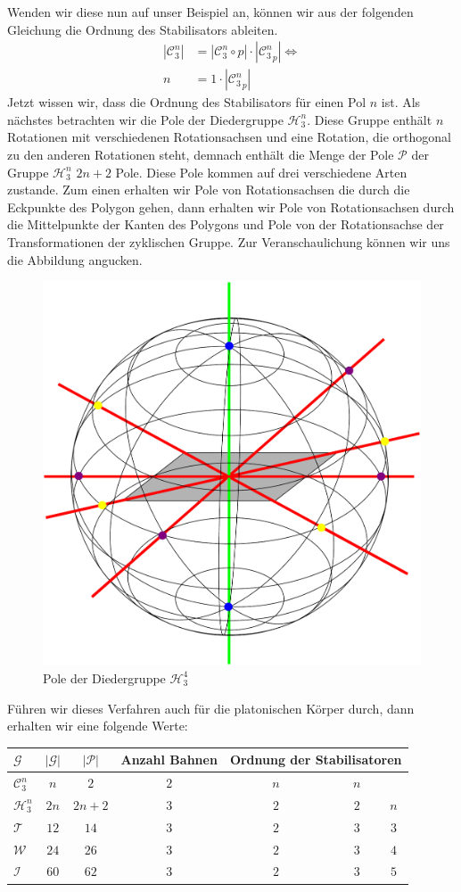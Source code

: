 Wenden wir diese nun auf unser Beispiel an, können wir aus der folgenden Gleichung die Ordnung des Stabilisators ableiten.
\begin{align*}
	 |\mathcal{C}_3^n| &= |\mathcal{C}_3^n \circ p| \cdot |{\mathcal{C}_3^n}_p| \Leftrightarrow\\
	 n &= 1 \cdot |{\mathcal{C}_3^n}_p|
\end{align*}
Jetzt wissen wir, dass die Ordnung des Stabilisators für einen Pol $n$ ist. Als nächstes betrachten wir die Pole der Diedergruppe $\mathcal{H}_3^n$. Diese Gruppe enthält $n$ Rotationen mit verschiedenen Rotationsachsen und eine Rotation, die orthogonal zu den anderen Rotationen steht, demnach enthält die Menge der Pole $\mathcal{P}$ der Gruppe $\mathcal{H}_3^n$ $2n+2$ Pole. Diese Pole kommen auf drei verschiedene Arten zustande. Zum einen erhalten wir Pole von Rotationsachsen die durch die Eckpunkte des Polygon gehen, dann erhalten wir Pole von Rotationsachsen durch die Mittelpunkte der Kanten des Polygons und Pole von der Rotationsachse der Transformationen der zyklischen Gruppe. Zur Veranschaulichung können wir uns die Abbildung angucken.
\begin{figure}[H]
\centering
\includegraphics[width=0.5\linewidth]{grafiken/pole_diedergruppe}
\caption{Pole der Diedergruppe $\mathcal{H}_3^4$}
\label{fig:pole_diedergruppe}
\end{figure}
Führen wir dieses Verfahren auch für die platonischen Körper durch, dann erhalten wir eine folgende Werte:
\begin{center}
	\begin{tabular}{l|cccccc}
		$\mathcal{G}$ & $|\mathcal{G}|$ & $|\mathcal{P}|$ & Anzahl Bahnen & \multicolumn{3}{c}{Ordnung der Stabilisatoren}\\
		\hline
		$\mathcal{C}^n_3$ & $n$ & $2$ & $2$ & \ \ \ \ \ $n$ & \ \ \ \ \ \ $n$ & \\
		$\mathcal{H}^n_3$ & $2n$ & $2n + 2$ & $3$ & \ \ \ \ \ $2$ & \ \ \ \ \ \ $2$ & $n$\\
		$\mathcal{T}$ & $12$ & $14$ & $3$ & \ \ \ \ \ $2$ & \ \ \ \ \ \ $3$ & $3$\\
		$\mathcal{W}$ & $24$ & $26$ & $3$ & \ \ \ \ \  $2$ & \ \ \ \ \ \ $3$ & $4$\\
		$\mathcal{I}$ & $60$ & $62$ & $3$ & \ \ \ \ \ $2$ & \ \ \ \ \ \ $3$ & $5$
	\end{tabular}
\end{center}
